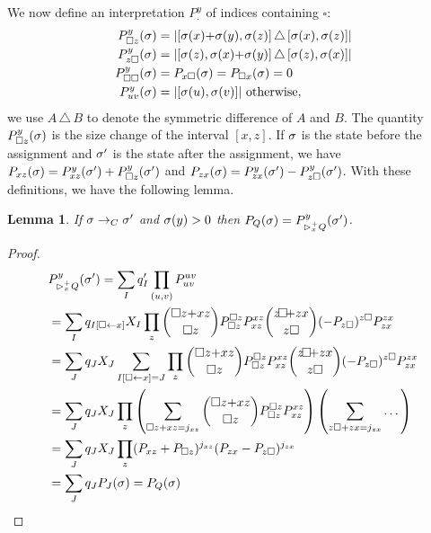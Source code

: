 \documentclass[nocopyrightspace,preprint]{sigplanconf-pldi15}
\newtheorem{lemma}{Lemma}
\begin{document}
We now define an interpretation $P_.^y$ of indices containing
$\square$:
\begin{align*}
P^y_{\square z}(\sigma) &=
  \left| [\sigma(x){+}\sigma(y), \sigma(z)] \,\triangle\,
         [\sigma(x), \sigma(z)] \right| \\
P^y_{z \square}(\sigma) &=
  \left| [\sigma(z), \sigma(x){+}\sigma(y)] \,\triangle\,
         [\sigma(z), \sigma(x)] \right| \\
P^y_{\square \square}(\sigma) &= P_{x \square}(\sigma)
  = P_{\square x}(\sigma) = 0 \\
P^y_{uv}(\sigma) &= |[\sigma(u), \sigma(v)]| \mbox{ otherwise},
\end{align*}
we use $A \,\triangle\, B$ to denote the symmetric difference
of $A$ and $B$.
The quantity $P^y_{\square z}(\sigma)$ is the size change of
the interval $[x, z]$.  If $\sigma$ is the state before the
assignment and $\sigma'$ is the state after the assignment, we
have
$P_{xz}(\sigma) = P^y_{xz}(\sigma') + P^y_{\square z}(\sigma')$
and
$P_{zx}(\sigma) = P^y_{zx}(\sigma') - P^y_{z \square}(\sigma')$.
With these definitions, we have the following lemma.
\begin{lemma}
If $\sigma \rightarrow_C \sigma'$ and $\sigma(y)>0$ then
$P_Q(\sigma) = P^y_{{\rhd}^+_x Q}(\sigma')$.
\end{lemma}
\begin{proof}
\small
\begin{align*}
&P^y_{{\rhd}_x^+ Q}(\sigma')
= \sum_I q'_I \prod_{(u,v)} P_{uv}^{uv} \\
&= \sum_I q_{I[\square\gets x]} X_I \prod_z
  \binom{\square z {+} xz}{\square z}P_{\square z}^{\square z} P_{xz}^{xz}
  \binom{z\! \square\! {+} zx}{z \square}(-P_{z \square})^{z \square} P_{zx}^{zx} \\
&= \sum_J q_J X_J \sum_{I[\square\gets x] = J} \prod_z
  \binom{\square z {+} xz}{\square z}P_{\square z}^{\square z} P_{xz}^{xz}
  \binom{z\! \square\! {+} zx}{z \square}(-P_{z \square})^{z \square} P_{zx}^{zx} \\
&= \sum_J q_J X_J \prod_z
  \left( \sum_{\square z + xz = j_{xz}}
    \binom{\square z {+} xz}{\square z}P_{\square z}^{\square z} P_{xz}^{xz} \right)
  \left( \sum_{z\square {+} zx = j_{zx}} \dots \right) \\
&= \sum_J q_J X_J \prod_z
  (P_{xz} + P_{\square z})^{j_{xz}}
  (P_{zx} - P_{z \square})^{j_{zx}} \\
&= \sum_J q_J P_J(\sigma) = P_Q(\sigma)
\end{align*}
\end{proof}
\end{document}
